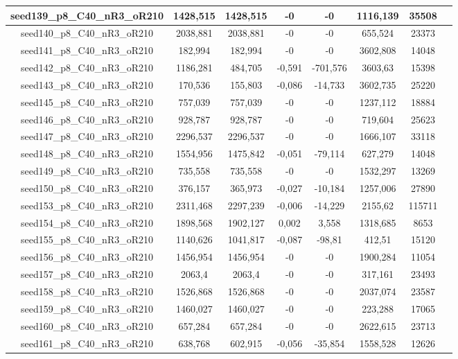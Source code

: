 \documentclass[a4paper]{article}
\begin{document}
\begin{center}
\begin{longtable}{cccccccc}
\hline
seed139\_p8\_C40\_nR3\_oR210 & 1428,515 & 1428,515 & -0 & -0 & 1116,139 & 35508\\
\hline
seed140\_p8\_C40\_nR3\_oR210 & 2038,881 & 2038,881 & -0 & -0 & 655,524 & 23373\\
\hline
seed141\_p8\_C40\_nR3\_oR210 & 182,994 & 182,994 & -0 & -0 & 3602,808 & 14048\\
\hline
seed142\_p8\_C40\_nR3\_oR210 & 1186,281 & 484,705 & -0,591 & -701,576 & 3603,63 & 15398\\
\hline
seed143\_p8\_C40\_nR3\_oR210 & 170,536 & 155,803 & -0,086 & -14,733 & 3602,735 & 25220\\
\hline
seed145\_p8\_C40\_nR3\_oR210 & 757,039 & 757,039 & -0 & -0 & 1237,112 & 18884\\
\hline
seed146\_p8\_C40\_nR3\_oR210 & 928,787 & 928,787 & -0 & -0 & 719,604 & 25623\\
\hline
seed147\_p8\_C40\_nR3\_oR210 & 2296,537 & 2296,537 & -0 & -0 & 1666,107 & 33118\\
\hline
seed148\_p8\_C40\_nR3\_oR210 & 1554,956 & 1475,842 & -0,051 & -79,114 & 627,279 & 14048\\
\hline
seed149\_p8\_C40\_nR3\_oR210 & 735,558 & 735,558 & -0 & -0 & 1532,297 & 13269\\
\hline
seed150\_p8\_C40\_nR3\_oR210 & 376,157 & 365,973 & -0,027 & -10,184 & 1257,006 & 27890\\
\hline
seed153\_p8\_C40\_nR3\_oR210 & 2311,468 & 2297,239 & -0,006 & -14,229 & 2155,62 & 115711\\
\hline
seed154\_p8\_C40\_nR3\_oR210 & 1898,568 & 1902,127 & 0,002 & 3,558 & 1318,685 & 8653\\
\hline
seed155\_p8\_C40\_nR3\_oR210 & 1140,626 & 1041,817 & -0,087 & -98,81 & 412,51 & 15120\\
\hline
seed156\_p8\_C40\_nR3\_oR210 & 1456,954 & 1456,954 & -0 & -0 & 1900,284 & 11054\\
\hline
seed157\_p8\_C40\_nR3\_oR210 & 2063,4 & 2063,4 & -0 & -0 & 317,161 & 23493\\
\hline
seed158\_p8\_C40\_nR3\_oR210 & 1526,868 & 1526,868 & -0 & -0 & 2037,074 & 23587\\
\hline
seed159\_p8\_C40\_nR3\_oR210 & 1460,027 & 1460,027 & -0 & -0 & 223,288 & 17065\\
\hline
seed160\_p8\_C40\_nR3\_oR210 & 657,284 & 657,284 & -0 & -0 & 2622,615 & 23713\\
\hline
seed161\_p8\_C40\_nR3\_oR210 & 638,768 & 602,915 & -0,056 & -35,854 & 1558,528 & 12626\\

\end{longtable}
\end{center}
\end{document}
